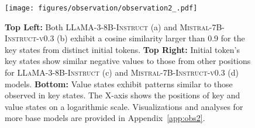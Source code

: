 \begin{figure}[t]
    \centering
    \texttt{[image: figures/observation/observation2\_.pdf]}
    \caption{\textbf{Top Left:} 
 Both \textsc{LLaMA-3-8B-Instruct} (a) and \textsc{Mistral-7B-Instruct-v0.3} (b) exhibit a cosine similarity larger than 0.9 for the key states from distinct initial tokens. \textbf{Top Right:} Initial token's key states show similar negative values to those from other positions for \textsc{LLaMA-3-8B-Instruct} (c) and \textsc{Mistral-7B-Instruct-v0.3} (d) models. \textbf{Bottom:} Value states exhibit patterns similar to those observed in key states. The X-axis shows the positions of key and value states on a logarithmic scale. Visualizations and analyses for more base models are provided in Appendix~\ref{app:obs2}.}
    \label{fig:observation2}
\end{figure}
